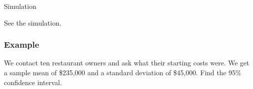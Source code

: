 \begin{frame}{Simulation}

  See the simulation.
  
\end{frame}


\begin{frame}
  \frametitle{Example}

  We contact ten restaurant owners and ask what their starting costs
  were. We get a sample mean of \$235,000 and a standard deviation of
  \$45,000. Find the 95\% confidence interval.

\end{frame}


